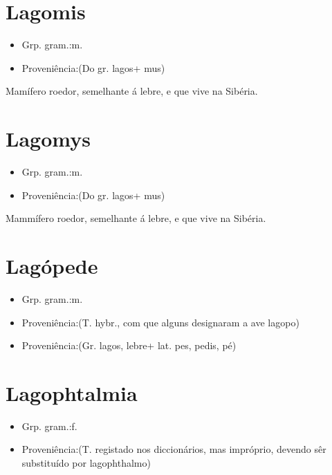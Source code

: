 \section{Lagomis}
\begin{itemize}
\item {Grp. gram.:m.}
\end{itemize}
\begin{itemize}
\item {Proveniência:(Do gr. \textunderscore lagos\textunderscore  + \textunderscore mus\textunderscore )}
\end{itemize}
Mamífero roedor, semelhante á lebre, e que vive na Sibéria.
\section{Lagomys}
\begin{itemize}
\item {Grp. gram.:m.}
\end{itemize}
\begin{itemize}
\item {Proveniência:(Do gr. \textunderscore lagos\textunderscore  + \textunderscore mus\textunderscore )}
\end{itemize}
Mammífero roedor, semelhante á lebre, e que vive na Sibéria.
\section{Lagópede}
\begin{itemize}
\item {Grp. gram.:m.}
\end{itemize}
\begin{itemize}
\item {Proveniência:(T. hybr., com que alguns designaram a ave lagopo)}
\end{itemize}
\begin{itemize}
\item {Proveniência:(Gr. \textunderscore lagos\textunderscore , \textunderscore lebre\textunderscore  + lat. \textunderscore pes\textunderscore , \textunderscore pedis\textunderscore , pé)}
\end{itemize}

\section{Lagophtalmia}
\begin{itemize}
\item {Grp. gram.:f.}
\end{itemize}
\begin{itemize}
\item {Proveniência:(T. registado nos diccionários, mas impróprio, devendo sêr substituído por \textunderscore lagophthalmo\textunderscore )}
\end{itemize}

